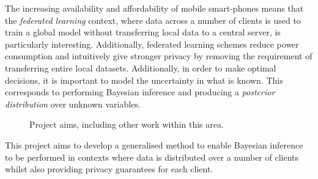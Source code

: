 The increasing availability and affordability of mobile smart-phones means that the \emph{federated learning} context, where data across a number of clients is used to train a global model without transferring local data to a central server, is particularly interesting. Additionally, federated learning schemes reduce power consumption and intuitively give stronger privacy by removing the requirement of transferring entire local datasets. \cite{google_ai_blog_2017} Additionally, in order to make optimal decisions, it is important to model the uncertainty in what is known. This corresponds to performing Bayesian inference and producing a \emph{posterior distribution} over unknown variables.

\begin{figure}
	
	\label{fig:intro:venn}
	\centering
	\caption{Project aims, including other work within this area. }
\end{figure} 

This project aims to develop a generalised method to enable Bayesian inference to be performed in contexts where data is distributed over a number of clients whilst also providing privacy guarantees for each client. 

